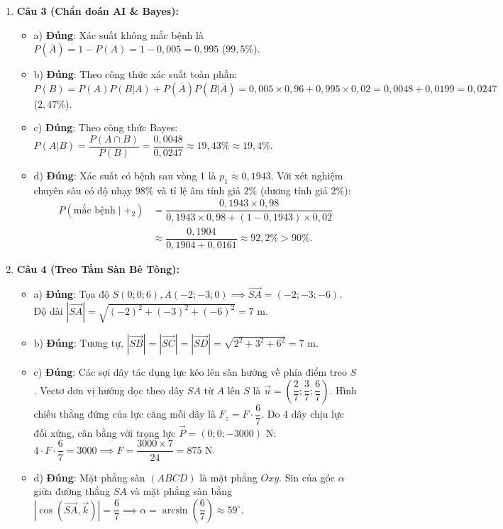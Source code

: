\documentclass[12pt,a4paper]{article}
\begin{document}
\begin{enumerate}[label=\textbf{Câu \arabic*:}, leftmargin=*]
\item \textbf{Câu 3 (Chẩn đoán AI \& Bayes):}
\begin{itemize}
    \item a) \textbf{Đúng}: Xác suất không mắc bệnh là $P(\overline{A}) = 1 - P(A) = 1 - 0{,}005 = 0{,}995$ ($99{,}5\%$).
    \item b) \textbf{Đúng}: Theo công thức xác suất toàn phần: $P(B) = P(A)P(B|A) + P(\overline{A})P(B|\overline{A}) = 0{,}005 \times 0{,}96 + 0{,}995 \times 0{,}02 = 0{,}0048 + 0{,}0199 = 0{,}0247$ ($2{,}47\%$).
    \item c) \textbf{Đúng}: Theo công thức Bayes: $P(A|B) = \dfrac{P(A \cap B)}{P(B)} = \dfrac{0{,}0048}{0{,}0247} \approx 19{,}43\% \approx 19{,}4\%$.
    \item d) \textbf{Đúng}: Xác suất có bệnh sau vòng 1 là $p_1 \approx 0{,}1943$. Với xét nghiệm chuyên sâu có độ nhạy $98\%$ và tỉ lệ âm tính giả $2\%$ (dương tính giả $2\%$):
    \begin{align*}
    P(\text{mắc bệnh} \mid +_2) &= \dfrac{0{,}1943 \times 0{,}98}{0{,}1943 \times 0{,}98 + (1 - 0{,}1943) \times 0{,}02} \\
    &\approx \dfrac{0{,}1904}{0{,}1904 + 0{,}0161} \approx 92{,}2\% > 90\%.
    \end{align*}
\end{itemize}

\item \textbf{Câu 4 (Treo Tấm Sàn Bê Tông):}
\begin{itemize}
    \item a) \textbf{Đúng}: Tọa độ $S(0; 0; 6), A(-2; -3; 0) \implies \overrightarrow{SA} = (-2; -3; -6)$.\\
    Độ dài $|\overrightarrow{SA}| = \sqrt{(-2)^2 + (-3)^2 + (-6)^2} = 7\text{ m}$.
    \item b) \textbf{Đúng}: Tương tự, $|\overrightarrow{SB}| = |\overrightarrow{SC}| = |\overrightarrow{SD}| = \sqrt{2^2 + 3^2 + 6^2} = 7\text{ m}$.
    \item c) \textbf{Đúng}: Các sợi dây tác dụng lực kéo lên sàn hướng về phía điểm treo $S$. Vectơ đơn vị hướng dọc theo dây $SA$ từ $A$ lên $S$ là $\vec{u} = \left(\dfrac{2}{7}; \dfrac{3}{7}; \dfrac{6}{7}\right)$. Hình chiếu thẳng đứng của lực căng mỗi dây là $F_z = F \cdot \dfrac{6}{7}$. Do 4 dây chịu lực đối xứng, cân bằng với trọng lực $\vec{P} = (0; 0; -3000)\text{ N}$:\\
    $4 \cdot F \cdot \dfrac{6}{7} = 3000 \implies F = \dfrac{3000 \times 7}{24} = 875\text{ N}$.
    \item d) \textbf{Đúng}: Mặt phẳng sàn $(ABCD)$ là mặt phẳng $Oxy$. Sin của góc $\alpha$ giữa đường thẳng $SA$ và mặt phẳng sàn bằng $|\cos(\overrightarrow{SA}, \vec{k})| = \dfrac{6}{7} \implies \alpha = \arcsin\left(\dfrac{6}{7}\right) \approx 59^\circ$.
\end{itemize}
\end{enumerate}
\end{document}
